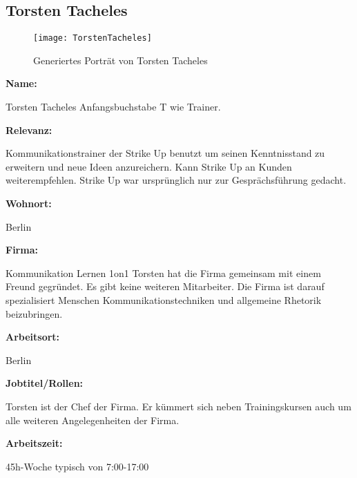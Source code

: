 \pagebreak
\subsection{Torsten Tacheles}
\label{subsec:torstentacheles}

\begin{figure}[htpb]
    \centering
    \texttt{[image: TorstenTacheles]}
    \caption{Generiertes Porträt von Torsten Tacheles \cite{misc:torstentacheles}}
    \label{img:torstentacheles}
\end{figure}

\textbf{Name:}
\par
\begingroup
\leftskip=30pt
\noindent
Torsten Tacheles \newline
Anfangsbuchstabe T wie Trainer.
\par
\endgroup
\textbf{Relevanz:}
\par
\begingroup
\leftskip=30pt
\noindent
Kommunikationstrainer der Strike Up benutzt um seinen Kenntnisstand zu erweitern und neue Ideen anzureichern. \newline
Kann Strike Up an Kunden weiterempfehlen. \newline
Strike Up war ursprünglich nur zur Gesprächsführung gedacht.
\par
\endgroup
\textbf{Wohnort:}
\par
\begingroup
\leftskip=30pt
\noindent
Berlin
\par
\endgroup
\textbf{Firma:}
\par
\begingroup
\leftskip=30pt
\noindent
Kommunikation Lernen 1on1 \newline
Torsten hat die Firma gemeinsam mit einem Freund gegründet. Es gibt keine weiteren Mitarbeiter. \newline
Die Firma ist darauf spezialisiert Menschen Kommunikationstechniken und allgemeine Rhetorik beizubringen.
\par
\endgroup
\textbf{Arbeitsort:}
\par
\begingroup
\leftskip=30pt
\noindent
Berlin
\par
\endgroup
\textbf{Jobtitel/Rollen:}
\par
\begingroup
\leftskip=30pt
\noindent
Torsten ist der Chef der Firma. Er kümmert sich neben Trainingskursen auch um alle weiteren Angelegenheiten der Firma.
\par
\endgroup
\textbf{Arbeitszeit:}
\par
\begingroup
\leftskip=30pt
\noindent
45h-Woche typisch von 7:00-17:00
\par
